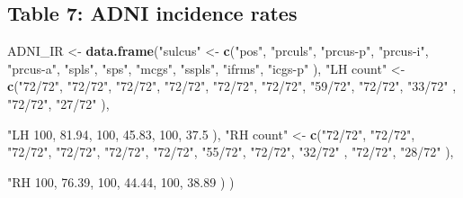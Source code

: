 \documentclass[
]{article}
\newenvironment{Shaded}{\begin{snugshade}}{\end{snugshade}}
\newcommand{\DecValTok}[1]{\textcolor[rgb]{0.00,0.00,0.81}{#1}}
\newcommand{\FloatTok}[1]{\textcolor[rgb]{0.00,0.00,0.81}{#1}}
\newcommand{\KeywordTok}[1]{\textcolor[rgb]{0.13,0.29,0.53}{\textbf{#1}}}
\newcommand{\NormalTok}[1]{#1}
\newcommand{\StringTok}[1]{\textcolor[rgb]{0.31,0.60,0.02}{#1}}
\begin{document}
\hypertarget{table-7-adni-incidence-rates}{%
\subsection{Table 7: ADNI incidence
rates}\label{table-7-adni-incidence-rates}}

\begin{Shaded}
\begin{Highlighting}[]
\NormalTok{ADNI_IR <-}\StringTok{ }\KeywordTok{data.frame}\NormalTok{(}\StringTok{"sulcus"}\NormalTok{ <-}\StringTok{ }\KeywordTok{c}\NormalTok{(}\StringTok{"pos"}\NormalTok{, }\StringTok{"prculs"}\NormalTok{, }\StringTok{"prcus-p"}\NormalTok{, }\StringTok{"prcus-i"}\NormalTok{, }\StringTok{"prcus-a"}\NormalTok{, }
                                         \StringTok{"spls"}\NormalTok{, }\StringTok{"sps"}\NormalTok{, }\StringTok{"mcgs"}\NormalTok{, }\StringTok{"sspls"}\NormalTok{, }\StringTok{"ifrms"}\NormalTok{, }\StringTok{"icgs-p"} 
\NormalTok{                                       ),}
                      \StringTok{"LH count"}\NormalTok{ <-}\StringTok{ }\KeywordTok{c}\NormalTok{(}\StringTok{"72/72"}\NormalTok{, }\StringTok{"72/72"}\NormalTok{, }\StringTok{"72/72"}\NormalTok{, }\StringTok{"72/72"}\NormalTok{, }\StringTok{"72/72"}\NormalTok{,}
                                      \StringTok{"72/72"}\NormalTok{, }\StringTok{"59/72"}\NormalTok{, }\StringTok{"72/72"}\NormalTok{, }\StringTok{"33/72"}\NormalTok{ , }\StringTok{"72/72"}\NormalTok{, }\StringTok{"27/72"}
\NormalTok{                           ),}
                           \StringTok{"LH %"}\NormalTok{ <-}\StringTok{ }\KeywordTok{c}\NormalTok{(}\DecValTok{100}\NormalTok{, }\DecValTok{100}\NormalTok{, }\DecValTok{100}\NormalTok{, }\DecValTok{100}\NormalTok{, }\DecValTok{100}\NormalTok{,}
                                       \DecValTok{100}\NormalTok{, }\FloatTok{81.94}\NormalTok{, }\DecValTok{100}\NormalTok{, }\FloatTok{45.83}\NormalTok{, }\DecValTok{100}\NormalTok{, }\FloatTok{37.5}
\NormalTok{                           ),}
                           \StringTok{"RH count"}\NormalTok{ <-}\StringTok{ }\KeywordTok{c}\NormalTok{(}\StringTok{"72/72"}\NormalTok{, }\StringTok{"72/72"}\NormalTok{, }\StringTok{"72/72"}\NormalTok{, }\StringTok{"72/72"}\NormalTok{, }\StringTok{"72/72"}\NormalTok{,}
                                      \StringTok{"72/72"}\NormalTok{, }\StringTok{"55/72"}\NormalTok{, }\StringTok{"72/72"}\NormalTok{, }\StringTok{"32/72"}\NormalTok{ , }\StringTok{"72/72"}\NormalTok{, }\StringTok{"28/72"}
\NormalTok{                      ),}
                           \StringTok{"RH %"}\NormalTok{ <-}\StringTok{ }\KeywordTok{c}\NormalTok{(}\DecValTok{100}\NormalTok{, }\DecValTok{100}\NormalTok{, }\DecValTok{100}\NormalTok{, }\DecValTok{100}\NormalTok{, }\DecValTok{100}\NormalTok{,}
                                       \DecValTok{100}\NormalTok{, }\FloatTok{76.39}\NormalTok{, }\DecValTok{100}\NormalTok{, }\FloatTok{44.44}\NormalTok{, }\DecValTok{100}\NormalTok{, }\FloatTok{38.89}
\NormalTok{                      )}
\NormalTok{                           )}

}}
\end{Highlighting}
\end{Shaded}
\end{document}
